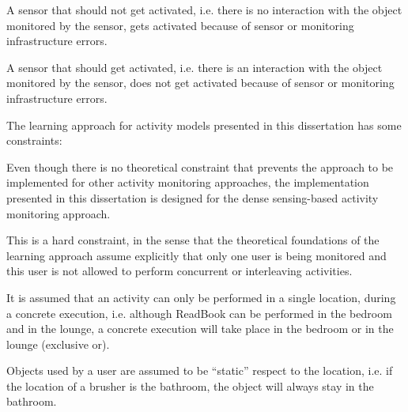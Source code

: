\begin{defn}
\label{def-positive}
 A sensor that should not get activated, i.e. there is no interaction with the object monitored by the sensor, gets activated because of sensor or monitoring infrastructure errors.
\end{defn}

\begin{defn}
\label{def-missing}
 A sensor that should get activated, i.e. there is an interaction with the object monitored by the sensor, does not get activated because of sensor or monitoring infrastructure errors.
\end{defn}



The learning approach for activity models presented in this dissertation has some constraints:

\begin{cons}
\label{cons-dense}
 Even though there is no theoretical constraint that prevents the approach to be implemented for other activity monitoring approaches, the implementation presented in this dissertation is designed for the dense sensing-based activity monitoring approach.
\end{cons}

\begin{cons}
\label{cons-single}
 This is a hard constraint, in the sense that the theoretical foundations of the learning approach assume explicitly that only one user is being monitored and this user is not allowed to perform concurrent or interleaving activities.
\end{cons}

\begin{cons}
\label{cons-location}
 It is assumed that an activity can only be performed in a single location, during a concrete execution, i.e. although ReadBook can be performed in the bedroom and in the lounge, a concrete execution will take place in the bedroom or in the lounge (exclusive or).
\end{cons}

\begin{cons}
\label{cons-static-obj}
 Objects used by a user are assumed to be ``static'' respect to the location, i.e. if the location of a brusher is the bathroom, the object will always stay in the bathroom.
\end{cons}